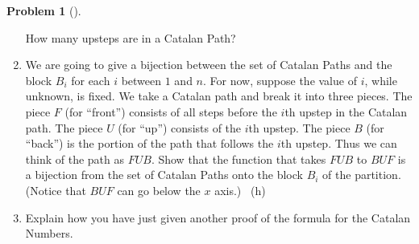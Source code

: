 \documentclass[10pt,]{book}
\theoremstyle{plain}
\theoremstyle{definition}
\newtheorem{activity}[project]{Problem}
\theoremstyle{definition}
\numberwithin{equation}{chapter}
\begin{document}
\begin{activity}[]
\begin{enumerate}[font=\bfseries,label=(\alph*),ref=\alph*]
How many upsteps are in a Catalan Path?%
\item\label{task-63}  \hypertarget{p-318}{}%
We are going to give a bijection between the set of Catalan Paths and the block \(B_i\) for each \(i\) between \(1\) and \(n\).  For now, suppose the value of \(i\), while unknown, is fixed.  We take a Catalan path and break it into three pieces.  The piece \(F\) (for ``front'') consists of all steps before the \(i\)th upstep in the Catalan path.  The piece \(U\) (for ``up'') consists of the \(i\)th upstep.  The piece \(B\) (for ``back'') is the portion of the path that follows the \(i\)th upstep.  Thus we can think of the path as \(FUB\).  Show that the function that takes \(FUB\) to \(BUF\) is a bijection from the set of Catalan Paths onto the block \(B_i\) of the partition.  (Notice that \(BUF\) can go below the \(x\) axis.)%
~{\tiny (h)}\item\label{task-64} \marginsymbol[-2.5em]{} \hypertarget{p-321}{}%
Explain how you have just given another proof of the formula for the Catalan Numbers.%
\end{enumerate}
\end{activity}
\typeout{************************************************}
\typeout{************************************************}
\end{document}
